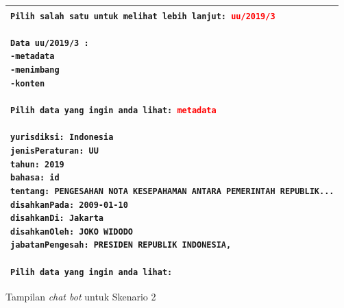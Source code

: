 \begin{listing}[H]
  \begin{center}
    \begin{tabular}{|p{}|}
      \hline
      \makecell[l]{
        \texttt{Pilih salah satu untuk melihat lebih lanjut: \textcolor{red}{uu/2019/3}} \\
        \\
        \texttt{Data uu/2019/3 :}                                                        \\
        \texttt{-metadata}                                                               \\
        \texttt{-menimbang}                                                              \\
        \texttt{-konten}                                                                 \\
        \\
        \texttt{Pilih data yang ingin anda lihat: \textcolor{red}{metadata}}             \\
        \\
        \texttt{yurisdiksi: Indonesia}                                                   \\
        \texttt{jenisPeraturan: UU}                                                      \\
        \texttt{tahun: 2019}                                                             \\
        \texttt{bahasa: id}                                                              \\
        \texttt{tentang:  PENGESAHAN NOTA KESEPAHAMAN ANTARA PEMERINTAH REPUBLIK...}     \\
        \texttt{disahkanPada: 2009-01-10}                                                \\
        \texttt{disahkanDi: Jakarta}                                                     \\
        \texttt{disahkanOleh: JOKO WIDODO}                                               \\
        \texttt{jabatanPengesah: PRESIDEN REPUBLIK INDONESIA,}                           \\
        \\
        \texttt{Pilih data yang ingin anda lihat:}
      }                                                                                  \\
      \hline
    \end{tabular}
  \end{center}
  \caption{Tampilan \textit{chat bot} untuk Skenario 2}
  \label{lst:chatbot-2}
\end{listing}



